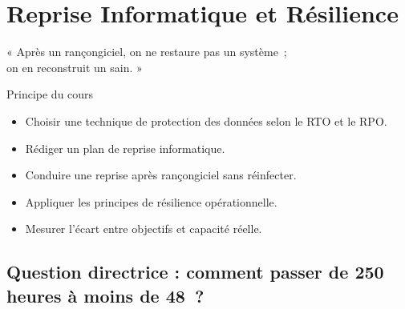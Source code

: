 
\chapter{Reprise Informatique et Résilience}
\label{chap:pra}

\epigraph{%
    « Après un rançongiciel, on ne restaure pas un système~;\\
    on en reconstruit un sain. »%
}{Principe du cours}


\begin{boxobjectifs}
\begin{itemize}
    \item Choisir une technique de protection des données selon le RTO et
          le RPO.
    \item Rédiger un plan de reprise informatique.
    \item Conduire une reprise après rançongiciel sans réinfecter.
    \item Appliquer les principes de résilience opérationnelle.
    \item Mesurer l'écart entre objectifs et capacité réelle.
\end{itemize}
\end{boxobjectifs}

\bigskip

\section*{Question directrice : comment passer de 250 heures à moins de 48~?}

